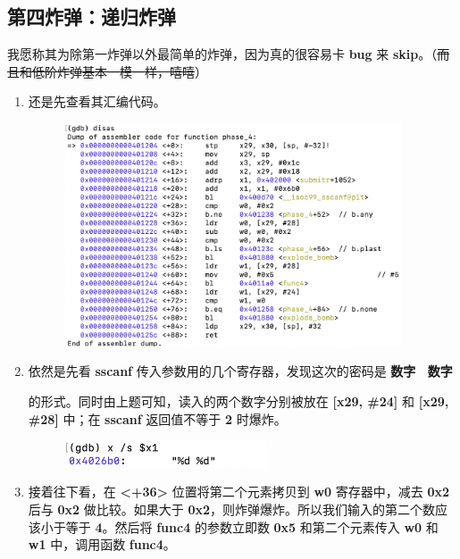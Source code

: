     \subsection{第四炸弹：递归炸弹}
        \par 我愿称其为除第一炸弹以外最简单的炸弹，因为真的很容易卡 \textbf{bug} 来 \textbf{skip}。（\sout{而且和低阶炸弹基本一模一样，嘻嘻}）
        \begin{enumerate}
            \item 还是先查看其汇编代码。
                \begin{figure}[htbp]
                    \hspace*{2cm}
                    \includegraphics*[width = 10cm]{s4_0.png}
                \end{figure}
            \item 依然是先看 \textbf{sscanf} 传入参数用的几个寄存器，发现这次的密码是 \textbf{数字 \ 数字} \par 的形式。同时由上题可知，读入的两个数字分别被放在 \textbf{[x29, \#24]} 和 \textbf{[x29, \#28]} 中；在 \textbf{sscanf} 返回值不等于 \textbf{2} 时爆炸。
                \begin{figure}[htbp]
                    \hspace*{2cm}
                    \includegraphics*[width = 6cm]{s4_1.png}
                \end{figure}
            \item 接着往下看，在 \textbf{<+36>} 位置将第二个元素拷贝到 \textbf{w0} 寄存器中，减去 \textbf{0x2} 后与 \textbf{0x2} 做比较。如果大于 \textbf{0x2}，则炸弹爆炸。所以我们输入的第二个数应该小于等于 \textbf{4}。然后将 \textbf{func4} 的参数立即数 \textbf{0x5} 和第二个元素传入 \textbf{w0}  和 \textbf{w1} 中，调用函数 \textbf{func4}。

\end{enumerate}
